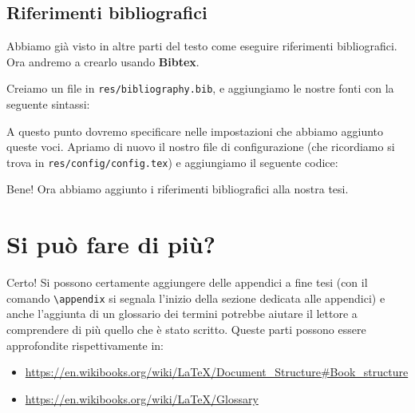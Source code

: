 \subsection{Riferimenti bibliografici}

Abbiamo già visto in altre parti del testo come eseguire riferimenti
bibliografici. Ora andremo a crearlo usando \textbf{Bibtex}.

Creiamo un file in \texttt{res/bibliography.bib}, e aggiungiamo le nostre fonti
con la seguente sintassi:



\noindent A questo punto dovremo specificare nelle impostazioni che abbiamo
aggiunto queste voci. Apriamo di nuovo il nostro file di configurazione (che
ricordiamo si trova in \texttt{res/config/config.tex}) e aggiungiamo il
seguente codice:



\noindent Bene! Ora abbiamo aggiunto i riferimenti bibliografici alla nostra
tesi.

\section{Si può fare di più?}

Certo! Si possono certamente aggiungere delle appendici a fine tesi (con il
comando \verb!\appendix! si segnala l'inizio della sezione dedicata alle
appendici) e anche l'aggiunta di un glossario dei termini potrebbe aiutare il
lettore a comprendere di più quello che è stato scritto.
Queste parti possono essere approfondite rispettivamente in:
\begin{itemize}
 \item
\url{https://en.wikibooks.org/wiki/LaTeX/Document_Structure#Book_structure}
 \item \url{https://en.wikibooks.org/wiki/LaTeX/Glossary}
\end{itemize}

